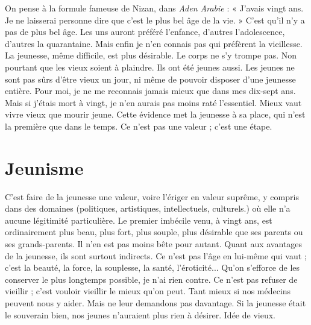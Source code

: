 {On pense à la formule fameuse de Nizan, dans {\it Aden Arabie} : « J'avais vingt
ans. Je ne laisserai personne dire que c’est le plus bel âge de la vie. » C’est qu'il
n’y a pas de plus bel âge. Les uns auront préféré l'enfance, d’autres l’adolescence,
d’autres la quarantaine. Mais enfin je n’en connais pas qui préfèrent la
vieillesse. La jeunesse, même difficile, est plus désirable. Le corps ne s’y trompe
pas. Non pourtant que les vieux soient à plaindre. Ils ont été jeunes aussi. Les
jeunes ne sont pas sûrs d’être vieux un jour, ni même de pouvoir disposer d’une
jeunesse entière. Pour moi, je ne me reconnais jamais mieux que dans mes
dix-sept ans. Mais si j'étais mort à vingt, je n’en aurais pas moins raté l’essentiel.
Mieux vaut vivre vieux que mourir jeune. Cette évidence met la jeunesse à
sa place, qui n’est la première que dans le temps. Ce n’est pas une valeur ; c'est
une étape.

\section{Jeunisme}
C’est faire de la jeunesse une valeur, voire l’ériger en valeur
suprême, y compris dans des domaines (politiques, artistiques,
intellectuels, culturels.) où elle n’a aucune légitimité particulière. Le premier
imbécile venu, à vingt ans, est ordinairement plus beau, plus fort, plus souple,
plus désirable que ses parents ou ses grands-parents. Il n’en est pas moins bête
pour autant. Quant aux avantages de la jeunesse, ils sont surtout indirects. Ce
n'est pas l’âge en lui-même qui vaut ; c’est la beauté, la force, la souplesse, la
santé, l’éroticité... Qu'on s'efforce de les conserver le plus longtemps possible,
je n’ai rien contre. Ce n’est pas refuser de vieillir ; c’est vouloir vieillir le mieux
qu'on peut. Tant mieux si nos médecins peuvent nous y aider. Mais ne leur
demandons pas davantage. Si la jeunesse était le souverain bien, nos jeunes
n'auraient plus rien à désirer. Idée de vieux.

}
